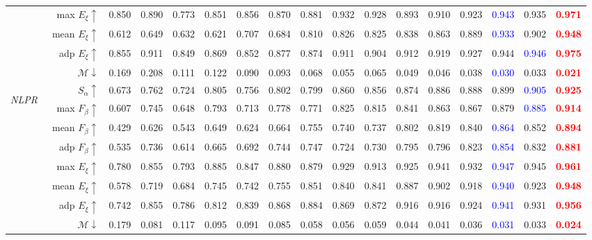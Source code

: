 \documentclass[journal]{IEEEtran}
\newcommand{\trb}[1]{\textbf{\textcolor{red}{#1}}}
\newcommand{\tbb}[1]{\textcolor{blue}{#1}}
\newcommand{\NLPR}{\textit{NLPR}~\cite{peng2014rgbd}}
\begin{document}
\begin{table*}[t!]
\begin{tabular}{lr|ccccc|ccccccccc|c}
		& max $E_{\xi}\uparrow$       & 0.850 & 0.890 & 0.773 & 0.851 & 0.856 & 0.870 & 0.881 & 0.932 & 0.928 & 0.893 & 0.910 & 0.923 & \tbb{0.943} & 0.935 & \trb{0.971} \\
		& mean $E_{\xi}\uparrow$     & 0.612 & 0.649 & 0.632 & 0.621 & 0.707 & 0.684 & 0.810 & 0.826 & 0.825 & 0.838 & 0.863 & 0.889 & \tbb{0.933} & 0.902 & \trb{0.948} \\
		& adp $E_{\xi}\uparrow$     & 0.855 & 0.911 & 0.849 & 0.869 & 0.852 & 0.877 & 0.874 & 0.911 & 0.904 & 0.912 & 0.919 & 0.927 & 0.944 & \tbb{0.946} & \trb{0.975} \\
		& $\mathcal{M}\downarrow$ & 0.169 & 0.208 & 0.111 & 0.122 & 0.090 & 0.093 & 0.068 & 0.055 & 0.065 & 0.049 & 0.046 & 0.038 & \tbb{0.030} & 0.033 & \trb{0.021} \\
		\midrule
		\multirow{8}{*}{\begin{sideways}\NLPR\end{sideways}}
		& $S_{\alpha}\uparrow$    & 0.673 & 0.762 & 0.724 & 0.805 & 0.756 & 0.802 & 0.799 & 0.860 & 0.856 & 0.874 & 0.886 & 0.888 & 0.899 & \tbb{0.905} & \trb{0.925} \\
		& max $F_{\beta}\uparrow$     & 0.607 & 0.745 & 0.648 & 0.793 & 0.713 & 0.778 & 0.771 & 0.825 & 0.815 & 0.841 & 0.863 & 0.867 & 0.879 & \tbb{0.885} & \trb{0.914} \\
		& mean $F_{\beta}\uparrow$     & 0.429 & 0.626 & 0.543 & 0.649 & 0.624 & 0.664 & 0.755 & 0.740 & 0.737 & 0.802 & 0.819 & 0.840 & \tbb{0.864} & 0.852 & \trb{0.894} \\
		& adp $F_{\beta}\uparrow$     & 0.535 & 0.736 & 0.614 & 0.665 & 0.692 & 0.744 & 0.747 & 0.724 & 0.730 & 0.795 & 0.796 & 0.823 & \tbb{0.854} & 0.832 & \trb{0.881} \\
		& max $E_{\xi}\uparrow$       & 0.780 & 0.855 & 0.793 & 0.885 & 0.847 & 0.880 & 0.879 & 0.929 & 0.913 & 0.925 & 0.941 & 0.932 & \tbb{0.947} & 0.945 & \trb{0.961} \\
		& mean $E_{\xi}\uparrow$     & 0.578 & 0.719 & 0.684 & 0.745 & 0.742 & 0.755 & 0.851 & 0.840 & 0.841 & 0.887 & 0.902 & 0.918 & \tbb{0.940} & 0.923 & \trb{0.948} \\
		& adp $E_{\xi}\uparrow$     & 0.742 & 0.855 & 0.786 & 0.812 & 0.839 & 0.868 & 0.884 & 0.869 & 0.872 & 0.916 & 0.916 & 0.924 & \tbb{0.941} & 0.931 & \trb{0.956} \\
		& $\mathcal{M}\downarrow$ & 0.179 & 0.081 & 0.117 & 0.095 & 0.091 & 0.085 & 0.058 & 0.056 & 0.059 & 0.044 & 0.041 & 0.036 & \tbb{0.031} & 0.033 & \trb{0.024} \\

\end{tabular}
\end{table*}
\end{document}
